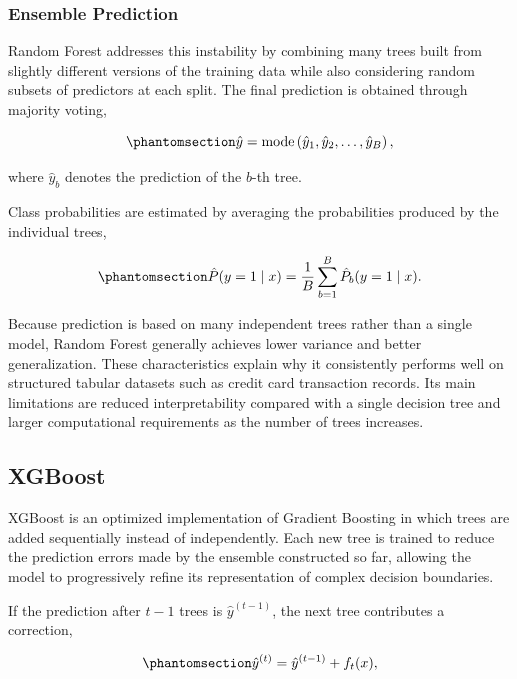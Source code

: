 \documentclass[
  12pt,
  letterpaper,
]{book}
\begin{document}
\subsubsection{Ensemble Prediction}\label{ensemble-prediction}

Random Forest addresses this instability by combining many trees built
from slightly different versions of the training data while also
considering random subsets of predictors at each split. The final
prediction is obtained through majority voting,

\begin{equation}\phantomsection\label{eq-rf-majority-vote}{
\hat{y}=\operatorname*{mode}\left(\hat{y}_1,\hat{y}_2,\ldots,\hat{y}_B\right),
}\end{equation}

where \(\hat{y}_b\) denotes the prediction of the \(b\)-th tree.

Class probabilities are estimated by averaging the probabilities
produced by the individual trees,

\begin{equation}\phantomsection\label{eq-rf-probability-ensemble}{
\hat{P}(y=1\mid x)=\frac{1}{B}\sum_{b=1}^{B}\hat{P}_b(y=1\mid x).
}\end{equation}

Because prediction is based on many independent trees rather than a
single model, Random Forest generally achieves lower variance and better
generalization. These characteristics explain why it consistently
performs well on structured tabular datasets such as credit card
transaction records. Its main limitations are reduced interpretability
compared with a single decision tree and larger computational
requirements as the number of trees increases.

\subsection{XGBoost}\label{xgboost}

XGBoost is an optimized implementation of Gradient Boosting in which
trees are added sequentially instead of independently. Each new tree is
trained to reduce the prediction errors made by the ensemble constructed
so far, allowing the model to progressively refine its representation of
complex decision boundaries.

If the prediction after \(t-1\) trees is \(\hat{y}^{(t-1)}\), the next
tree contributes a correction,

\begin{equation}\phantomsection\label{eq-xgb-additive-model}{
\hat{y}^{(t)}=\hat{y}^{(t-1)}+f_t(x),
}\end{equation}
\end{document}
